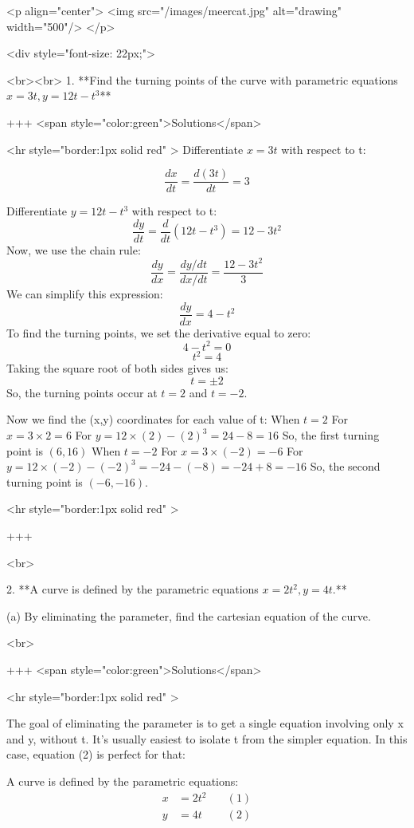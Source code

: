 <p align="center">
<img src="/images/meercat.jpg" alt="drawing" width="500"/>
</p>

<div style="font-size: 22px;">

<br><br>
1. **Find the turning points of the curve with parametric equations $x=3 t, y=12 t-t^{3}$**

+++ <span style="color:green">Solutions</span>

<hr style="border:1px solid red" >
Differentiate $x=3t$ with respect to t:

$$
\frac{dx}{dt} = \frac{d(3t)}{dt} = 3
$$

Differentiate $y=12t−t^3$ with respect to t:
$$
\frac{dy}{dt} = \frac{d}{dt}(12t - t^3) = 12 - 3t^2
$$
Now, we use the chain rule:
$$
\frac{dy}{dx} = \frac{dy/dt}{dx/dt} = \frac{12 - 3t^2}{3}
$$
We can simplify this expression:
$$
\frac{dy}{dx} = 4 - t^2
$$
To find the turning points, we set the derivative equal to zero:
$$
4 - t^2 = 0
$$
$$
t^2 = 4
$$
Taking the square root of both sides gives us:
$$
t = \pm 2
$$
So, the turning points occur at $t=2$ and $t=−2$.

Now we find the (x,y) coordinates for each value of t:
When $t=2$
For $x=3\times 2=6$
For $y=12 \times (2)−(2)^3 =24−8=16$
So, the first turning point is $(6,16)$
When $t=−2$
For $x=3\times(−2)=−6$
For $y=12\times(−2)−(−2)^3=−24−(−8)=−24+8=−16$
So, the second turning point is $(−6,−16)$.

<hr style="border:1px solid red" >

+++

<br>

2. **A curve is defined by the parametric equations $x=2 t^{2}, y=4 t$.**

(a) By eliminating the parameter, find the cartesian equation of the curve.

<br>

+++ <span style="color:green">Solutions</span>

<hr style="border:1px solid red" >

The goal of eliminating the parameter is to get a single equation involving only x and y, without t. It's usually easiest to isolate t from the simpler equation. In this case, equation (2) is perfect for that:

A curve is defined by the parametric equations:
\begin{align*} x &= 2t^2 \quad &(1) \\ y &= 4t \quad &(2)\end{align*}

